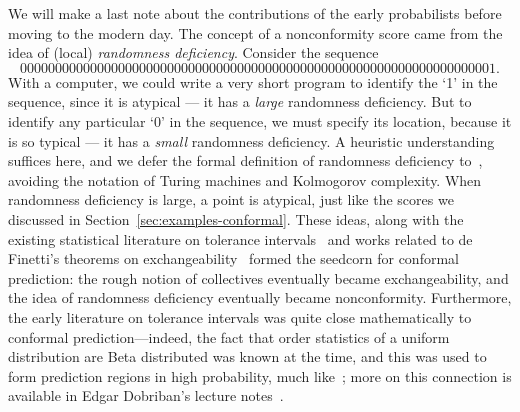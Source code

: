 \documentclass[10pt]{article}
\begin{document}
We will make a last note about the contributions of the early probabilists before moving to the modern day.
The concept of a nonconformity score came from the idea of (local) \emph{randomness deficiency}.
Consider the sequence
\begin{equation}
    00000000000000000000000000000000000000000000000000000000000000000001.
\end{equation}
With a computer, we could write a very short program to identify the `1' in the sequence, since it is atypical --- it has a \emph{large} randomness deficiency.  
But to identify any particular `0' in the sequence, we must specify its location, because it is so typical --- it has a \emph{small} randomness deficiency.
A heuristic understanding suffices here, and we defer the formal definition of randomness deficiency to~\cite{mota2013sophistication}, avoiding the notation of Turing machines and Kolmogorov complexity.
When randomness deficiency is large, a point is atypical, just like the scores we discussed in Section~\ref{sec:examples-conformal}.
These ideas, along with the existing statistical literature on tolerance intervals~\cite{wilks1941,wilks1942,wald1943,tukey1947} and works related to de Finetti's theorems on exchangeability~\cite{diaconis1980finite,aldous1985exchangeability,de1929funzione,freedman1965bernard,hewitt1955symmetric,kingman1978uses} formed the seedcorn for conformal prediction: the rough notion of collectives eventually became exchangeability, and the idea of randomness deficiency eventually became nonconformity.
Furthermore, the early literature on tolerance intervals was quite close mathematically to conformal prediction---indeed, the fact that order statistics of a uniform distribution are Beta distributed was known at the time, and this was used to form prediction regions in high probability, much like~\cite{vovk2012conditional}; more on this connection is available in Edgar Dobriban's lecture notes~\cite{dobriban2022topics}. 
\end{document}
